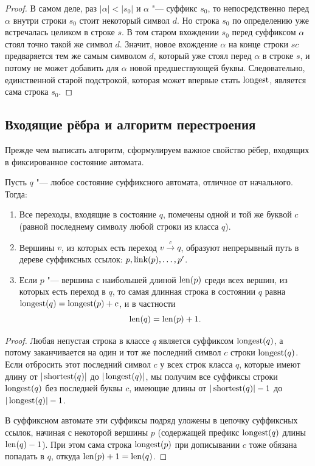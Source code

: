 \begin{proof}
    В самом деле, раз $|\alpha| < |s_0|$ и $\alpha$ "--- суффикс $s_0$, то непосредственно перед $\alpha$ внутри строки $s_0$ стоит некоторый символ $d$. Но строка $s_0$ по определению уже встречалась целиком в строке $s$. В том старом вхождении $s_0$ перед суффиксом $\alpha$ стоял точно такой же символ $d$. Значит, новое вхождение $\alpha$ на конце строки $sc$ предваряется тем же самым символом $d$, который уже стоял перед $\alpha$ в строке $s$, и потому не может добавить для $\alpha$ новой предшествующей буквы. Следовательно, единственной старой подстрокой, которая может впервые стать $\operatorname{longest}$, является сама строка $s_0$.
\end{proof}

\subsection{Входящие рёбра и алгоритм перестроения}

Прежде чем выписать алгоритм, сформулируем важное свойство рёбер, входящих в фиксированное состояние автомата.

\begin{lemma}\label{lem:sa_incoming}
    Пусть $q$ "--- любое состояние суффиксного автомата, отличное от начального. Тогда:
    \begin{enumerate}
        \item Все переходы, входящие в состояние $q$, помечены одной и той же буквой $c$ (равной последнему символу любой строки из класса $q$).
        \item Вершины $v$, из которых есть переход $v \xrightarrow{c} q$, образуют непрерывный путь в дереве суффиксных ссылок: $p, \operatorname{link}(p), \dots, p'$.
        \item Если $p$ "--- вершина с наибольшей длиной $\operatorname{len}(p)$ среди всех вершин, из которых есть переход в $q$, то самая длинная строка в состоянии $q$ равна $\operatorname{longest}(q) = \operatorname{longest}(p) + c$, и в частности
        \[
            \operatorname{len}(q) = \operatorname{len}(p) + 1.
        \]
    \end{enumerate}
\end{lemma}

\begin{proof}
    Любая непустая строка в классе $q$ является суффиксом $\operatorname{longest}(q)$, а потому заканчивается на один и тот же последний символ $c$ строки $\operatorname{longest}(q)$. Если отбросить этот последний символ $c$ у всех строк класса $q$, которые имеют длину от $|\operatorname{shortest}(q)|$ до $|\operatorname{longest}(q)|$, мы получим все суффиксы строки $\operatorname{longest}(q)$ без последней буквы $c$, имеющие длины от $|\operatorname{shortest}(q)| - 1$ до $|\operatorname{longest}(q)| - 1$.

    В суффиксном автомате эти суффиксы подряд уложены в цепочку суффиксных ссылок, начиная с некоторой вершины $p$ (содержащей префикс $\operatorname{longest}(q)$ длины $\operatorname{len}(q) - 1$). При этом сама строка $\operatorname{longest}(p)$ при дописывании $c$ тоже обязана попадать в $q$, откуда $\operatorname{len}(p) + 1 = \operatorname{len}(q)$.
\end{proof}


